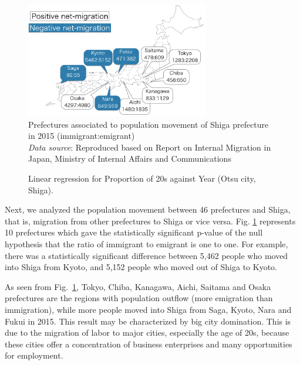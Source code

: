 \documentclass[10pt, conference, compsocconf]{IEEEtran}
\begin{document}
\begin{figure}[!h]
\begin{center}
	\includegraphics[width= 8cm]{fig/slide.png}
\caption{Prefectures associated to population movement of Shiga prefecture in 2015 (immigrant:emigrant)
\\
{\it Data source}:  Reproduced based on Report on Internal Migration in Japan, Ministry of Internal Affairs and Communications}
\label{fig29}
\end{center}
\end{figure}
\begin{figure}[!t]
\begin{center}
\caption{Linear regression for Proportion of 20s against Year (Otsu city, Shiga). }
\label{fig31}
\end{center}
\end{figure}







Next, we analyzed the population movement between 46 prefectures and Shiga, that is, migration from other prefectures to Shiga or vice versa.
 Fig. \ref{fig29} represents 10 prefectures which gave the statistically significant p-value
of the null hypothesis that
the ratio of immigrant to emigrant is one to one.
For example, there was a statistically significant difference between 5,462 people who moved into Shiga from Kyoto, and 5,152 people who moved out of Shiga to Kyoto.

As seen from Fig.~\ref{fig29}, Tokyo, Chiba, Kanagawa, Aichi, Saitama and Osaka prefectures are the regions with population outflow (more emigration than immigration), while more people moved into Shiga from Saga, Kyoto, Nara and Fukui in 2015. 
This result may be characterized by big city domination. This is due to the migration of labor to major cities, especially the age of 20s, because these cities offer a concentration of business enterprises and
many opportunities for employment.
\end{document}
